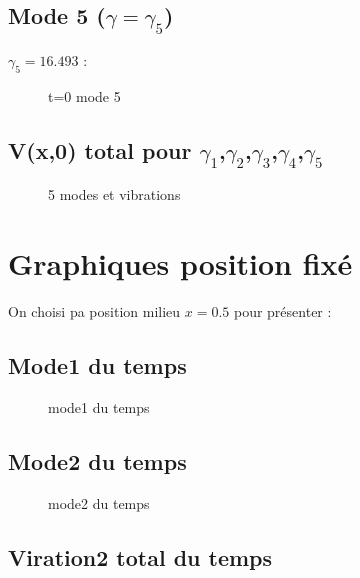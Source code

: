 \documentclass[a4paper,10pt]{report} %
\begin{document}
\subsection{Mode 5 ($\gamma=\gamma_5$)}

$\gamma_5=16.493$ :

\begin{figure}[H]
\centering
\label{figure5}
\caption{t=0 mode 5}
\end{figure}

\subsection{V(x,0) total pour $\gamma_1$,$\gamma_2$,$\gamma_3$,$\gamma_4$,$\gamma_5$}


\begin{figure}[H]
\centering
\label{figure6}
\caption{5 modes et vibrations}
\end{figure}


\section{Graphiques position fixé}

On choisi pa position milieu $x=0.5$ pour présenter :


\subsection{Mode1 du temps }

\begin{figure}[H]
\centering
\label{figure7}
\caption{mode1 du temps}
\end{figure}

\subsection{Mode2 du temps }

\begin{figure}[H]
\centering
\label{figure8}
\caption{mode2 du temps}
\end{figure}

\subsection{Viration2 total du temps }
\end{document}
